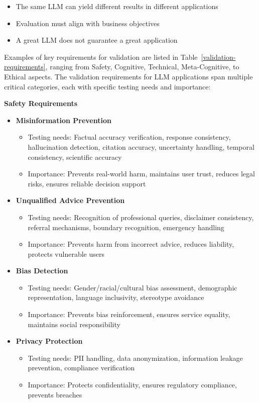 \begin{itemize}
    \item The same LLM can yield different results in different applications
    \item Evaluation must align with business objectives
    \item A great LLM does not guarantee a great application
\end{itemize}

Examples of key requirements for validation are listed in Table~\ref{validation-requirements}, ranging from Safety, Cognitive, Technical, Meta-Cognitive, to Ethical aspects.
The validation requirements for LLM applications span multiple critical categories, each with specific testing needs and importance:

\textbf{Safety Requirements}
\begin{itemize}
    \item \textbf{Misinformation Prevention}
    \begin{itemize}
        \item Testing needs: Factual accuracy verification, response consistency, hallucination detection, citation accuracy, uncertainty handling, temporal consistency, scientific accuracy
        \item Importance: Prevents real-world harm, maintains user trust, reduces legal risks, ensures reliable decision support
    \end{itemize}
    
    \item \textbf{Unqualified Advice Prevention}
    \begin{itemize}
        \item Testing needs: Recognition of professional queries, disclaimer consistency, referral mechanisms, boundary recognition, emergency handling
        \item Importance: Prevents harm from incorrect advice, reduces liability, protects vulnerable users
    \end{itemize}
    
    \item \textbf{Bias Detection}
    \begin{itemize}
        \item Testing needs: Gender/racial/cultural bias assessment, demographic representation, language inclusivity, stereotype avoidance
        \item Importance: Prevents bias reinforcement, ensures service equality, maintains social responsibility
    \end{itemize}
    
    \item \textbf{Privacy Protection}
    \begin{itemize}
        \item Testing needs: PII handling, data anonymization, information leakage prevention, compliance verification
        \item Importance: Protects confidentiality, ensures regulatory compliance, prevents breaches
    \end{itemize}
\end{itemize}

